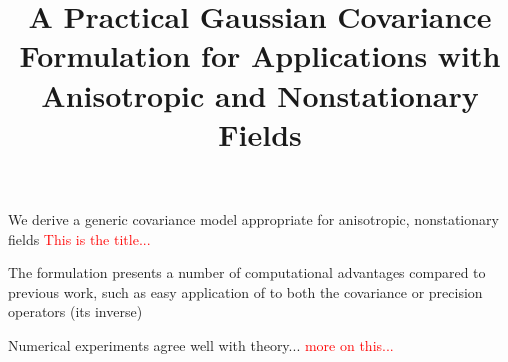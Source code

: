 \documentclass[draft]{Feb-3-22-latex-templates/agujournal2019}
\newcommand{\red}[1]{\textcolor{red}{#1}}
\begin{document}
\title{A Practical Gaussian Covariance Formulation for Applications with
       Anisotropic and Nonstationary Fields}


\begin{keypoints}
    \item We derive a generic covariance model appropriate for anisotropic,
        nonstationary fields \red{This is the title...}
    \item The formulation presents a number of computational advantages compared
        to previous work, such as easy application of to both the covariance or
        precision operators (its inverse)
    \item Numerical experiments agree well with theory... \red{more on this...}
\end{keypoints}
\end{document}
